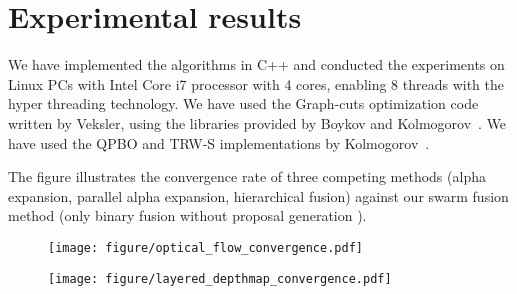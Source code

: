 \section{Experimental results} \label{section:results}
We have implemented the algorithms in C++ and conducted the experiments
on Linux PCs with Intel Core i7 processor with 4 cores, enabling 8 threads
with the hyper threading technology. We have used the Graph-cuts
optimization code written by Veksler, using the libraries provided by
Boykov and Kolmogorov~\cite{middle_bury,2,3,4_below}.
%
%
We have used the QPBO and TRW-S implementations by
Kolmogorov~\cite{msr_link?,trw_link}.



The figure illustrates the convergence rate of three competing methods
(alpha expansion, parallel alpha expansion, hierarchical fusion) against
our swarm fusion method (only binary fusion without proposal
generation ).

\begin{figure}[tb]
  \texttt{[image: figure/optical\_flow\_convergence.pdf]}
  \caption{}\label{fig:optical_flow_convergence}
\end{figure}
\begin{figure}[tb]
 \texttt{[image: figure/layered\_depthmap\_convergence.pdf]}
 \caption{}\label{fig:layered_depthmap_convergence}
\end{figure}



